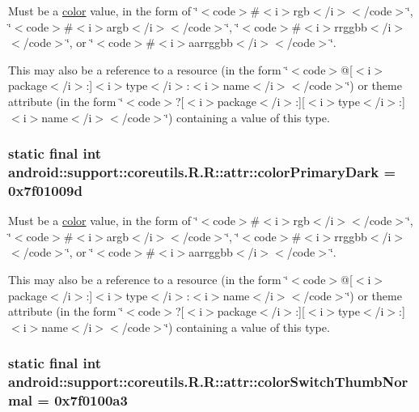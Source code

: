 Must be a \hyperlink{classandroid_1_1support_1_1coreutils_1_1_r_1_1color}{color} value, in the form of \char`\"{}$<$code$>$\#$<$i$>$rgb$<$/i$>$$<$/code$>$\char`\"{}, \char`\"{}$<$code$>$\#$<$i$>$argb$<$/i$>$$<$/code$>$\char`\"{}, \char`\"{}$<$code$>$\#$<$i$>$rrggbb$<$/i$>$$<$/code$>$\char`\"{}, or \char`\"{}$<$code$>$\#$<$i$>$aarrggbb$<$/i$>$$<$/code$>$\char`\"{}. 

This may also be a reference to a resource (in the form \char`\"{}$<$code$>$@\mbox{[}$<$i$>$package$<$/i$>$:\mbox{]}$<$i$>$type$<$/i$>$:$<$i$>$name$<$/i$>$$<$/code$>$\char`\"{}) or theme attribute (in the form \char`\"{}$<$code$>$?\mbox{[}$<$i$>$package$<$/i$>$:\mbox{]}\mbox{[}$<$i$>$type$<$/i$>$:\mbox{]}$<$i$>$name$<$/i$>$$<$/code$>$\char`\"{}) containing a value of this type. \hypertarget{classandroid_1_1support_1_1coreutils_1_1_r_1_1attr_1f23e92eb340ea537711e2c2c20de08e}{
\subsubsection[{colorPrimaryDark}]{\setlength{\rightskip}{0pt plus 5cm}static final int android::support::coreutils.R.R::attr::colorPrimaryDark = 0x7f01009d}}
\label{classandroid_1_1support_1_1coreutils_1_1_r_1_1attr_1f23e92eb340ea537711e2c2c20de08e}


Must be a \hyperlink{classandroid_1_1support_1_1coreutils_1_1_r_1_1color}{color} value, in the form of \char`\"{}$<$code$>$\#$<$i$>$rgb$<$/i$>$$<$/code$>$\char`\"{}, \char`\"{}$<$code$>$\#$<$i$>$argb$<$/i$>$$<$/code$>$\char`\"{}, \char`\"{}$<$code$>$\#$<$i$>$rrggbb$<$/i$>$$<$/code$>$\char`\"{}, or \char`\"{}$<$code$>$\#$<$i$>$aarrggbb$<$/i$>$$<$/code$>$\char`\"{}. 

This may also be a reference to a resource (in the form \char`\"{}$<$code$>$@\mbox{[}$<$i$>$package$<$/i$>$:\mbox{]}$<$i$>$type$<$/i$>$:$<$i$>$name$<$/i$>$$<$/code$>$\char`\"{}) or theme attribute (in the form \char`\"{}$<$code$>$?\mbox{[}$<$i$>$package$<$/i$>$:\mbox{]}\mbox{[}$<$i$>$type$<$/i$>$:\mbox{]}$<$i$>$name$<$/i$>$$<$/code$>$\char`\"{}) containing a value of this type. \hypertarget{classandroid_1_1support_1_1coreutils_1_1_r_1_1attr_5bd634a4785e4869aa2e850c18b6947e}{
\subsubsection[{colorSwitchThumbNormal}]{\setlength{\rightskip}{0pt plus 5cm}static final int android::support::coreutils.R.R::attr::colorSwitchThumbNormal = 0x7f0100a3}}
\label{classandroid_1_1support_1_1coreutils_1_1_r_1_1attr_5bd634a4785e4869aa2e850c18b6947e}


